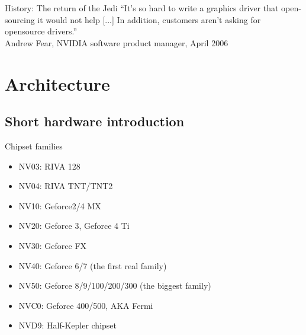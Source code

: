 \documentclass[11pt,english,compress]{beamer}
\begin{document}
	\begin{frame}
		\begin{block}{History: The return of the Jedi}
			``It's so hard to write a graphics driver that open-sourcing it
			would not help [...] In addition, customers aren't asking for opensource drivers.''\\
			Andrew Fear, NVIDIA software product manager, April 2006
		\end{block}
	\end{frame}

\section{Architecture}
	\subsection{Short hardware introduction}
		\begin{frame}
			\begin{block}{Chipset families}
				\begin{itemize}
					\item NV03: RIVA 128
					\item NV04: RIVA TNT/TNT2
					\item NV10: Geforce2/4 MX
					\item NV20: Geforce 3, Geforce 4 Ti
					\item NV30: Geforce FX
					\item NV40: Geforce 6/7 (the first real family) 
					\item NV50: Geforce 8/9/100/200/300 (the biggest family)
					\item NVC0: Geforce 400/500, AKA Fermi
					\item NVD9: Half-Kepler chipset
				\end{itemize}
			\end{block}
		\end{frame}
\end{document}
